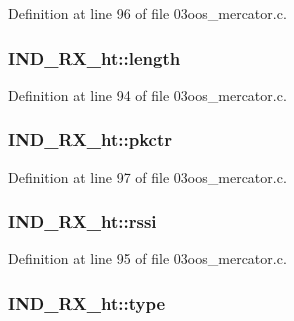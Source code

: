 Definition at line 96 of file 03oos\+\_\+mercator.\+c.

\subsubsection[{\texorpdfstring{length}{length}}]{ I\+N\+D\+\_\+\+R\+X\+\_\+ht\+::length}\hypertarget{struct_i_n_d___r_x__ht_af9d4cd2597943520f639acdd5b02afa7}{}\label{struct_i_n_d___r_x__ht_af9d4cd2597943520f639acdd5b02afa7}


Definition at line 94 of file 03oos\+\_\+mercator.\+c.

\subsubsection[{\texorpdfstring{pkctr}{pkctr}}]{ I\+N\+D\+\_\+\+R\+X\+\_\+ht\+::pkctr}\hypertarget{struct_i_n_d___r_x__ht_ab6378f63555f46485d589b3370caa776}{}\label{struct_i_n_d___r_x__ht_ab6378f63555f46485d589b3370caa776}


Definition at line 97 of file 03oos\+\_\+mercator.\+c.

\subsubsection[{\texorpdfstring{rssi}{rssi}}]{ I\+N\+D\+\_\+\+R\+X\+\_\+ht\+::rssi}\hypertarget{struct_i_n_d___r_x__ht_ae0b8433651b81cc26fd48e07b7a941c2}{}\label{struct_i_n_d___r_x__ht_ae0b8433651b81cc26fd48e07b7a941c2}


Definition at line 95 of file 03oos\+\_\+mercator.\+c.

\subsubsection[{\texorpdfstring{type}{type}}]{ I\+N\+D\+\_\+\+R\+X\+\_\+ht\+::type}\hypertarget{struct_i_n_d___r_x__ht_a521849db4071f512108fc18d5910b65b}{}\label{struct_i_n_d___r_x__ht_a521849db4071f512108fc18d5910b65b}


